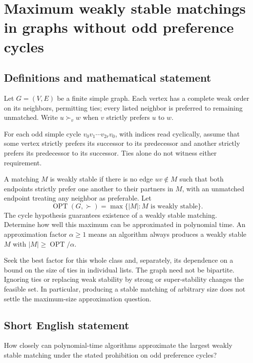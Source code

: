 \documentclass[11pt,a4paper]{article}
\begin{document}
\section*{Maximum weakly stable matchings in graphs without odd preference cycles}\label{statement}

\subsection{Definitions and mathematical statement}
Let $G=(V,E)$ be a finite simple graph. Each vertex has a complete
weak order on its neighbors, permitting ties; every listed neighbor is
preferred to remaining unmatched. Write $u\succ_v w$ when $v$
strictly prefers $u$ to $w$.

For each odd simple cycle $v_0v_1\cdots v_{2r}v_0$, with indices
read cyclically, assume that some vertex strictly prefers its successor
to its predecessor and another strictly prefers its predecessor to its
successor. Ties alone do not witness either requirement.

A matching $M$ is weakly stable if there is no edge $uv\notin M$
such that both endpoints strictly prefer one another to their partners
in $M$, with an unmatched endpoint treating any neighbor as preferable.
Let
\[
 \operatorname{OPT}(G,\succ)=\max\{|M|:M\text{ is weakly stable}\}.
\]
The cycle hypothesis guarantees existence of a weakly stable matching.
Determine how well this maximum can be approximated in polynomial time.
An approximation factor $\alpha\ge1$ means an algorithm always produces
a weakly stable $M$ with $|M|\ge\operatorname{OPT}/\alpha$.

Seek the best factor for this whole class and, separately, its dependence
on a bound on the size of ties in individual lists. The graph need not
be bipartite. Ignoring ties or replacing weak stability by strong or
super-stability changes the feasible set. In particular, producing a
stable matching of arbitrary size does not settle the maximum-size
approximation question.
\subsection{Short English statement}
How closely can polynomial-time algorithms approximate the largest weakly stable matching under the stated prohibition on odd preference cycles?
\end{document}
